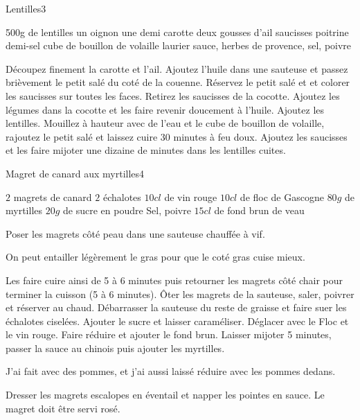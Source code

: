 \begin{recette}{Lentilles}{3}{}{}
\begin{ingredients}
\ingredient 500g de lentilles
\ingredient un oignon
\ingredient une demi carotte
\ingredient deux gousses d'ail
 saucisses
\ingredient poitrine demi-sel
\ingredient cube de bouillon de volaille
\ingredient laurier sauce, herbes de provence, sel, poivre
\end{ingredients}

\begin{preparation}
\etape Découpez finement la carotte et l'ail.
\etape Ajoutez l'huile dans une sauteuse et passez brièvement le petit salé du coté de la couenne.
\etape Réservez le petit salé et  et colorer les saucisses sur toutes les faces.
\etape Retirez les saucisses de la cocotte.
\etape Ajoutez les légumes dans la cocotte et les faire revenir doucement à l'huile.
\etape Ajoutez les lentilles. Mouillez à hauteur avec de l'eau et le cube de bouillon de volaille, rajoutez le petit salé et laissez cuire 30 minutes à feu doux.
\etape Ajoutez les saucisses et les faire mijoter une dizaine de minutes dans les lentilles cuites.
\end{preparation}

\end{recette}

\begin{recette}{Magret de canard aux myrtilles}{4}{}{}
\begin{ingredients}
\ingredient $2$ magrets de canard
\ingredient $2$ échalotes
\ingredient  $10 \unit{cl}$ de vin rouge
\ingredient  $10 \unit{cl}$ de floc de Gascogne
\ingredient  $80 \unit{g}$ de myrtilles
\ingredient  $20 \unit{g}$ de sucre en poudre
\ingredient  Sel, poivre
\ingredient  $15 \unit{cl}$ de fond brun de veau
\end{ingredients}

\begin{preparation}
\etape Poser les magrets côté peau dans une sauteuse chauffée à vif.
\begin{remarque}
On peut entailler légèrement le gras pour que le coté gras cuise mieux.
\end{remarque}
Les faire cuire ainsi de 5 à 6 minutes puis retourner les magrets côté chair pour
terminer la cuisson (5 à 6 minutes).
\etape Ôter les magrets de la sauteuse, saler, poivrer et réserver au chaud.
Débarrasser la sauteuse du reste de graisse et faire suer les échalotes
ciselées. Ajouter le sucre et laisser caraméliser. Déglacer avec le Floc
et le vin rouge. Faire réduire et ajouter le fond brun. Laisser mijoter
5 minutes, passer la sauce au chinois puis ajouter les myrtilles.
\begin{remarque}
J'ai fait avec des pommes, et j'ai aussi laissé réduire avec les pommes dedans.
\end{remarque}
\etape Dresser les magrets escalopes en éventail et napper les pointes en sauce.
\etape Le magret doit être servi rosé.
\end{preparation}

\end{recette}

